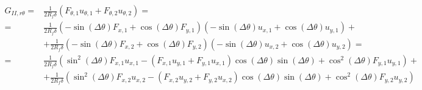 \documentclass[a4paper]{jpconf}
\begin{document}
\begin{equation}
\begin{split}
G_{II,r\theta} = &\frac{1}{2R_{f}\delta}\left(F_{\theta,1}u_{\theta,1}+F_{\theta,2}u_{\theta,2}\right)=\\
= &\frac{1}{2R_{f}\delta}\left(-\sin\left(\Delta\theta\right) F_{x,1}+\cos\left(\Delta\theta\right)F_{y,1}\right)\left(-\sin\left(\Delta\theta\right) u_{x,1}+\cos\left(\Delta\theta\right) u_{y,1}\right)+\\
&+\frac{1}{2R_{f}\delta}\left(-\sin\left(\Delta\theta\right) F_{x,2}+\cos\left(\Delta\theta\right)F_{y,2}\right)\left(-\sin\left(\Delta\theta\right) u_{x,2}+\cos\left(\Delta\theta\right) u_{y,2}\right)=\\
= &\frac{1}{2R_{f}\delta}\left(\sin^{2}\left(\Delta\theta\right) F_{x,1}u_{x,1}-\left(F_{x,1}u_{y,1}+F_{y,1}u_{x,1}\right)\cos\left(\Delta\theta\right)\sin\left(\Delta\theta\right)+\cos^{2}\left(\Delta\theta\right)F_{y,1}u_{y,1}\right)+\\
 &+\frac{1}{2R_{f}\delta}\left(\sin^{2}\left(\Delta\theta\right) F_{x,2}u_{x,2}-\left(F_{x,2}u_{y,2}+F_{y,2}u_{x,2}\right)\cos\left(\Delta\theta\right)\sin\left(\Delta\theta\right)+\cos^{2}\left(\Delta\theta\right)F_{y,2}u_{y,2}\right)\\
\end{split}
\end{equation}
\end{document}
